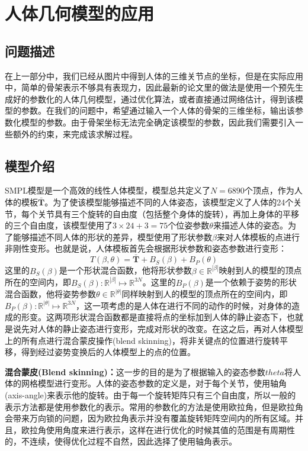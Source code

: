 \newpage
\section{人体几何模型的应用}
\subsection{问题描述}
在上一部分中，我们已经从图片中得到人体的三维关节点的坐标，但是在实际应用中，简单的骨架表示不够具有表现力，因此最新的论文里的做法是使用一个预先生成好的参数化的人体几何模型，通过优化算法，或者直接通过网络估计，得到该模型的参数。在我们的问题中，希望通过输入一个人体的骨架的三维坐标，输出该参数化模型的参数。由于骨架坐标无法完全确定该模型的参数，因此我们需要引入一些额外的约束，来完成该求解过程。

\subsection{模型介绍}
SMPL模型是一个高效的线性人体模型，模型总共定义了\(N = 6890\)个顶点，作为人体的模板\(\bar{\bm{T}}\)。为了使该模型能够描述不同的人体姿态，该模型定义了人体的24个关节，每个关节具有三个旋转的自由度（包括整个身体的旋转），再加上身体的平移的三个自由度，该模型使用了\(3\times 24 + 3 = 75\)个位姿参数\(\theta\)来描述人体的姿态。为了能够描述不同人体的形状的差异，模型使用了形状参数\(\beta\)来对人体模板的点进行非刚性变形。也就是说，人体模板首先会根据形状参数和姿态参数进行变形：
\begin{equation}
    T(\beta, \theta) = \bar{\bm{T}} + B_S(\beta) + B_P(\theta)
\end{equation}
这里的\(B_S(\beta)\)是一个形状混合函数，他将形状参数\(\beta \in \mathbb{R}^{|\beta|}\)映射到人的模型的顶点所在的空间内，即\(B_S(\beta):\mathbb{R}^{|\beta|} \mapsto \mathbb{R}^{3N}\)。这里的\(B_P(\beta)\)是一个依赖于姿势的形状混合函数，他将姿势参数\(\theta \in \mathbb{R}^{|\theta|}\)同样映射到人的模型的顶点所在的空间内，即\(B_P(\beta):\mathbb{R}^{|\theta|} \mapsto \mathbb{R}^{3N}\)，这一项考虑的是人体在进行不同的动作的时候，对身体的造成的形变。这两项形状混合函数都是直接将点的坐标加到人体的静止姿态下，也就是说先对人体的静止姿态进行变形，完成对形状的改变。在这之后，再对人体模型上的所有点进行混合蒙皮操作(blend skinning)，将非关键点的位置进行旋转平移，得到经过姿势变换后的人体模型上的点的位置。

\textbf{混合蒙皮(Blend skinning)：}这一步的目的是为了根据输入的姿态参数\(theta\)将人体的网格模型进行变形。人体的姿态参数的定义是，对于每个关节，使用轴角(axis-angle)来表示他的旋转。由于每一个旋转矩阵只有三个自由度，所以一般的表示方法都是使用参数化的表示。常用的参数化的方法是使用欧拉角，但是欧拉角会带来万向锁的问题，因为欧拉角表示并没有覆盖旋转矩阵空间内的所有区域。并且，欧拉角使用角度来进行表示，这样在进行优化的时候其值的范围是有周期性的，不连续，使得优化过程不自然，因此选择了使用轴角表示。

